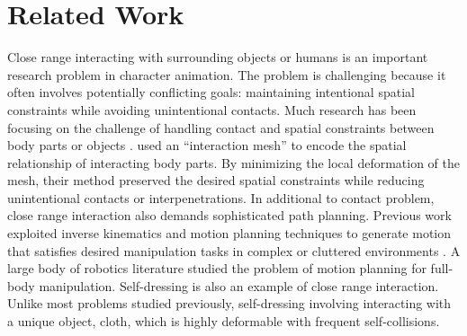 \section{Related Work}

Close range interacting with surrounding objects or humans is an important research problem in character animation. The problem is challenging because it often involves potentially conflicting goals: maintaining intentional spatial constraints while avoiding unintentional contacts. Much research has been focusing on the challenge of handling contact and spatial constraints between body parts or objects \cite{Glechier:1998,Liu:2006,Ho:2009:CMS,Ho:2010:SRP}.  used an ``interaction mesh'' to encode the spatial relationship of interacting body parts. By minimizing the local deformation of the mesh, their method preserved the desired spatial constraints while reducing unintentional contacts or interpenetrations. In additional to contact problem, close range interaction also demands sophisticated path planning. Previous work exploited inverse kinematics and motion planning techniques to generate motion that satisfies desired manipulation tasks in complex or cluttered environments \cite{Kallman:2003,Yamane:2004:SAH,Bai:2012:SCO}. A large body of robotics literature studied the problem of motion planning for full-body manipulation\cite{Harada et al. 2003; Takubo et al. 2005; Yoshida et al. 2005; Nishiwaki et al. 2006}. Self-dressing is also an example of close range interaction. Unlike most problems studied previously, self-dressing involving interacting with a unique object, cloth, which is highly deformable with frequent self-collisions. 






